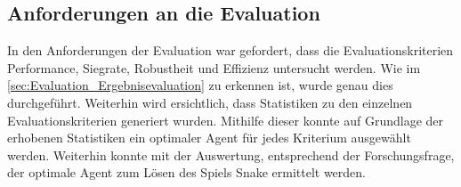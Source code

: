 \subsection{Anforderungen an die Evaluation}
In den Anforderungen der Evaluation war gefordert, dass die Evaluationskriterien Performance, Siegrate, Robustheit und Effizienz untersucht werden. Wie im \autoref{sec:Evaluation_Ergebnisevaluation} zu erkennen ist, wurde genau dies durchgeführt. Weiterhin wird ersichtlich, dass Statistiken zu den einzelnen Evaluationskriterien generiert wurden. Mithilfe dieser konnte auf Grundlage der erhobenen Statistiken ein optimaler Agent für jedes Kriterium ausgewählt werden. Weiterhin konnte mit der Auswertung, entsprechend der Forschungsfrage, der optimale Agent zum Lösen des Spiels Snake ermittelt werden.